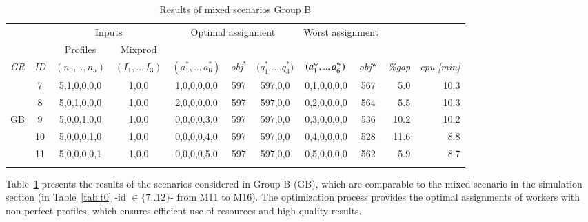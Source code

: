 \documentclass[review,12pt, 3p, times]{elsarticle}
\begin{document}
					
\begin{longtable}{|c|c|c|c|c|c|c|c|c|r|r|}
	\hline
	& & \multicolumn{2}{c|}{Inputs} & \multicolumn{3}{c|}{Optimal assignment} & \multicolumn{2}{c|}{Worst assignment }& \multicolumn{2}{c|}{}\\
	&  & Profiles & Mixprod & \multicolumn{3}{c|}{} & \multicolumn{2}{c|}{} & \multicolumn{2}{c|}{}\\
    \it{GR} & \it{ID} & \multicolumn{1}{c|}{$(n_0,..,n_5)$} & \multicolumn{1}{c|}{$(I_1,..,I_3)$} & {$(a^*_1,..,a^*_6)$} & \it{obj}$^*$ & $(q^*_1$,...,$q^*_3)$ & {$(a^{\textsc{w}}_1,..,a^{\textsc{w}}_6)$} & \it{obj}$^{\textsc{w}}$ & \it{\%gap}   & \it{ cpu [min]} \\	
	\hline
	        & 7       & 5,1,0,0,0,0                         & 1,0,0                               & 1,0,0,0,0,0          & 597          & 597,0,0               & 0,1,0,0,0,0                                & 567                     & 5.0      & 10.3  \\
	        & 8       & 5,0,1,0,0,0                         & 1,0,0                               & 2,0,0,0,0,0          & 597          & 597,0,0               & 0,2,0,0,0,0                                & 564                     & 5.5        & 10.3   \\
	GB      & 9       & 5,0,0,1,0,0                         & 1,0,0                               & 0,0,0,0,3,0          & 597          & 597,0,0               & 0,3,0,0,0,0                                & 536                     & 10.2        & 10.2  \\
	        & 10      & 5,0,0,0,1,0                         & 1,0,0                               & 0,0,0,0,4,0          & 597          & 597,0,0               & 0,4,0,0,0,0                                & 528                     & 11.6       & 8.8   \\
	        & 11      & 5,0,0,0,0,1                         & 1,0,0                               & 0,0,0,0,5,0          & 597          & 597,0,0               & 0,5,0,0,0,0                                & 562                     & 5.9        & 8.7   \\
	\hline
	\caption{Results of mixed scenarios  Group B} 													
	\label{tab:tr_gb}
\end{longtable}
										
Table~\ref{tab:tr_gb} presents the results of the scenarios considered in Group B (GB), which are comparable to the mixed scenario in the simulation section (in Table~\ref{tab:t0} -id $\in \{7..12\}$- from M11 to M16). The optimization process provides the optimal assignments of workers with non-perfect profiles, which ensures efficient use of resources and high-quality results.
			
\end{document}
